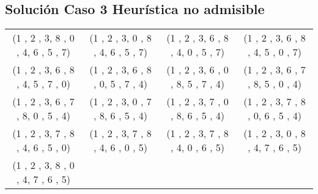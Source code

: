 \documentclass[11pt]{article}
\begin{document}
\subsection{Solución Caso 3 Heurística no admisible}
\begin{tabular}{c c c c}
(1 , 2 , 3,
8 , 0 , 4,
6 , 5 , 7)
&

(1 , 2 , 3,
0 , 8 , 4,
6 , 5 , 7)
&

(1 , 2 , 3,
6 , 8 , 4,
0 , 5 , 7)
&

(1 , 2 , 3,
6 , 8 , 4,
5 , 0 , 7)
\\

(1 , 2 , 3,
6 , 8 , 4,
5 , 7 , 0)
&

(1 , 2 , 3,
6 , 8 , 0,
5 , 7 , 4)
&

(1 , 2 , 3,
6 , 0 , 8,
5 , 7 , 4)
&

(1 , 2 , 3,
6 , 7 , 8,
5 , 0 , 4)
\\


(1 , 2 , 3,
6 , 7 , 8,
0 , 5 , 4)
&

(1 , 2 , 3,
0 , 7 , 8,
6 , 5 , 4)
&

(1 , 2 , 3,
7 , 0 , 8,
6 , 5 , 4)
&

(1 , 2 , 3,
7 , 8 , 0,
6 , 5 , 4)
\\

(1 , 2 , 3,
7 , 8 , 4,
6 , 5 , 0)
&

(1 , 2 , 3,
7 , 8 , 4,
6 , 0 , 5)
&

(1 , 2 , 3,
7 , 8 , 4,
0 , 6 , 5)
&

(1 , 2 , 3,
0 , 8 , 4,
7 , 6 , 5)
\\

(1 , 2 , 3,
8 , 0 , 4,
7 , 6 , 5)

&

&

&

\\
\end{tabular}

    \clearpage
    \nocite{*}
    \printbibliography
    
    
\end{document}
